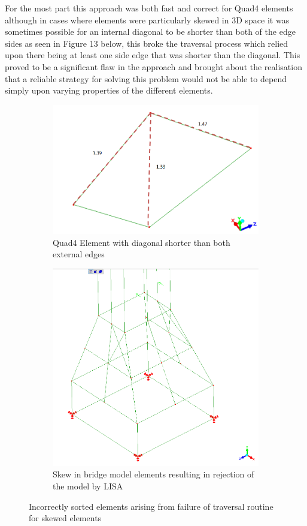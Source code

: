 \vspace{0.4cm}
\newline
\noindent
For the most part this approach was both fast and correct for Quad4 elements although in cases where elements were particularly skewed in 3D space it was sometimes possible for an internal diagonal to be shorter than both of the edge sides as seen in Figure 13 below, this broke the traversal process which relied upon there being at least one side edge that was shorter than the diagonal. This proved to be a significant flaw in the approach and brought about the realisation that a reliable strategy for solving this problem would not be able to depend simply upon varying properties of the different elements. \\ 

\begin{figure}[!h]
\centering
\begin{subfigure}{.5\textwidth}
  \centering
  \includegraphics[width=0.9\linewidth]{../Graphics/SkewedElementIssues.png}
  \caption{Quad4 Element with diagonal shorter than both external edges}
  \label{fig:sub1}
\end{subfigure}%
\begin{subfigure}{.5\textwidth}
  \centering
  \includegraphics[width=0.7\linewidth]{../Graphics/ElementSkewOnBridge.png}
  \caption{Skew in bridge model elements resulting in rejection of the model by LISA}
  \label{fig:sub2}
\end{subfigure}
\caption{Incorrectly sorted elements arising from failure of traversal routine for skewed elements}
\label{fig:test}
\end{figure}

